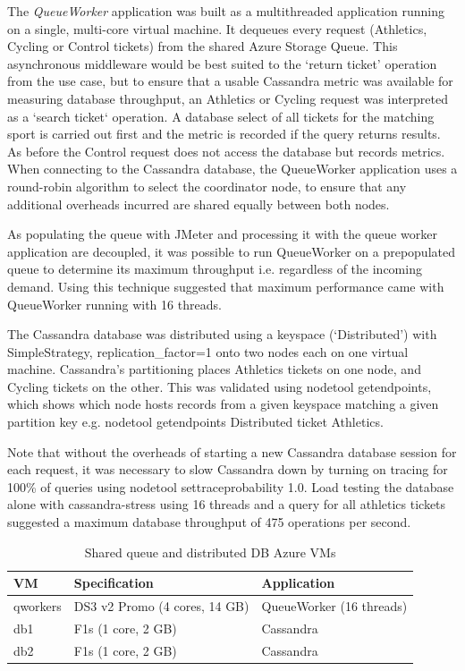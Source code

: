 \documentclass[runningheads]{llncs}
\begin{document}
The {\itshape QueueWorker} application was built as a multithreaded application running on a single, multi-core virtual machine.  It dequeues every request (Athletics, Cycling or Control tickets) from the shared Azure Storage Queue.  This asynchronous middleware would be best suited to the `return ticket' operation from the use case, but to ensure that a usable Cassandra metric was available for measuring database throughput, an Athletics or Cycling request was interpreted as a `search ticket` operation.  A database select of all tickets for the matching sport is carried out first and the metric is recorded if the query returns results.  As before the Control request does not access the database but records metrics.  When connecting to the Cassandra database, the QueueWorker application uses a round-robin algorithm to select the coordinator node, to ensure that any additional overheads incurred are shared equally between both nodes.

As populating the queue with JMeter and processing it with the queue worker application are decoupled, it was possible to run QueueWorker on a prepopulated queue to determine its maximum throughput i.e. regardless of the incoming demand.  Using this technique suggested that maximum performance came with QueueWorker running with 16 threads.

The Cassandra database was distributed using a keyspace (`Distributed') with SimpleStrategy, replication\_factor=1 onto two nodes each on one virtual machine.  Cassandra's partitioning places Athletics tickets on one node, and Cycling tickets on the other.  This was validated using nodetool getendpoints, which shows which node hosts records from a given keyspace matching a given partition key e.g. nodetool getendpoints Distributed ticket Athletics.

Note that without the overheads of starting a new Cassandra database session for each request, it was necessary to slow Cassandra down by turning on tracing for 100\% of queries using nodetool settraceprobability 1.0.  Load testing the database alone with cassandra-stress using 16 threads and a query for all athletics tickets suggested a maximum database throughput of 475 operations per second.

\begin{table}[h!]
	\centering
	\caption{Shared queue and distributed DB Azure VMs}
	\label{table:builtddnr_vmdesign}
	\begin{tabular}{l | l | l}
		VM		& Specification			& Application \\
		\hline
		qworkers	& DS3 v2 Promo (4 cores, 14 GB)	& QueueWorker (16 threads) \\
		db1		& F1s (1 core, 2 GB)		& Cassandra \\
		db2		& F1s (1 core, 2 GB)		& Cassandra \\
	\end{tabular}
\end{table}
\end{document}
